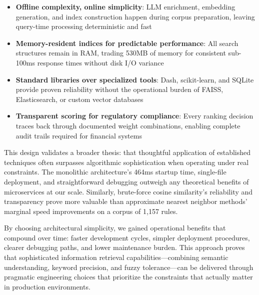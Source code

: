 \begin{itemize}[leftmargin=*,itemsep=3pt,topsep=3pt]
  \item \textbf{Offline complexity, online simplicity}: LLM enrichment, embedding generation, and index construction happen during corpus preparation, leaving query-time processing deterministic and fast
  \item \textbf{Memory-resident indices for predictable performance}: All search structures remain in RAM, trading 530MB of memory for consistent sub-100ms response times without disk I/O variance
  \item \textbf{Standard libraries over specialized tools}: Dash, scikit-learn, and SQLite provide proven reliability without the operational burden of FAISS, Elasticsearch, or custom vector databases
  \item \textbf{Transparent scoring for regulatory compliance}: Every ranking decision traces back through documented weight combinations, enabling complete audit trails required for financial systems
\end{itemize}

This design validates a broader thesis: that thoughtful application of established techniques often surpasses algorithmic sophistication when operating under real constraints. The monolithic architecture's 464ms startup time, single-file deployment, and straightforward debugging outweigh any theoretical benefits of microservices at our scale. Similarly, brute-force cosine similarity's reliability and transparency prove more valuable than approximate nearest neighbor methods' marginal speed improvements on a corpus of 1,157 rules.

By choosing architectural simplicity, we gained operational benefits that compound over time: faster development cycles, simpler deployment procedures, clearer debugging paths, and lower maintenance burden. This approach proves that sophisticated information retrieval capabilities—combining semantic understanding, keyword precision, and fuzzy tolerance—can be delivered through pragmatic engineering choices that prioritize the constraints that actually matter in production environments.